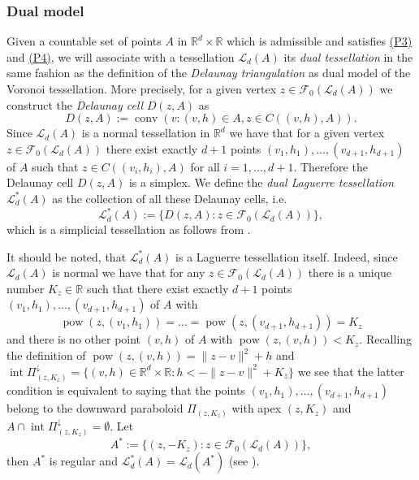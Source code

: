 \documentclass[11pt,a4paper]{article}
\theoremstyle{plain}
\theoremstyle{definition}
\theoremstyle{remark}
\def\RR{\mathbb{R}}
\def\cF{\mathcal{F}}
\def\cL{\mathcal{L}}
\newcommand{\conv}{\mathop{\mathrm{conv}}\nolimits}
\newcommand{\pow}{\mathop{\mathrm{pow}}\nolimits}
\newcommand{\inter}{\operatorname{int}}
\begin{document}
\subsubsection{Dual model}\label{sec:DualModel}

Given a countable set of points $A$ in $\RR^d \times \RR$ which is admissible and satisfies \hyperref[item:P3]{(P3)} and \hyperref[item:P4]{(P4)}, we will associate with a tessellation $\cL_d(A)$ its \textit{dual tessellation} in the same fashion as the definition of the \textit{Delaunay triangulation} as dual model of the Voronoi tessellation. More precisely, for a given vertex $z\in\cF_0(\cL_d(A))$ we construct the \textit{Delaunay cell} $D(z,A)$ as 
\[
    D(z,A) := \conv(v:(v,h)\in A,z\in C((v,h),A)).
\]
Since $\cL_d(A)$ is a normal tessellation in $\RR^d$ we have that for a given vertex $z\in \cF_0(\cL_d(A))$ there exist exactly $d+1$ points $(v_1,h_1),\dots,(v_{d+1},h_{d+1})$ of $A$ such that $z\in C((v_i,h_i),A)$ for all $i=1,\dots,d+1$. Therefore the Delaunay cell $D(z,A)$ is a simplex. We define the \textit{dual Laguerre tessellation} $\cL_d^*(A)$ as the collection of all these Delaunay cells, i.e.
\[
    \cL_d^*(A):=\{D(z,A):z\in \cF_0(\cL_d(A))\},
\]  
which is a simplicial tessellation as follows from \cite[Proposition 2]{Sch93}. 

It should be noted, that $\cL_d^*(A)$ is a Laguerre tessellation itself. Indeed, since $\cL_d(A)$ is normal we have that for any $z\in\cF_0(\cL_d(A))$ there is a unique number $K_z\in \RR$ such that there exist exactly $d+1$ points $(v_1,h_1),\dots,(v_{d+1},h_{d+1})$ of $A$ with
\[
    \pow(z,(v_1,h_1))=\ldots=\pow(z,(v_{d+1},h_{d+1}))=K_z
\]
and there is no other point $(v,h)$ of $A$ with $\pow(z,(v,h)) < K_z$. Recalling the definition of $\pow(z,(v,h))=\|z-v\|^2+h$ and $\inter \Pi_{(z,K_z)}^{\downarrow}=\{(v,h)\in \RR^d \times \RR: h < - \|z-v\|^2 + K_z \}$ we see that the latter condition is equivalent to saying that the points $(v_1,h_1),\dots,(v_{d+1},h_{d+1})$ belong to the downward paraboloid $\Pi_{(z,K_z)}$ with apex $(z,K_z)$ and $A\cap \inter \Pi_{(z,K_z)}^{\downarrow}=\emptyset$. Let
\begin{equation}\label{eq:Astar}
    A^*:=\{(z,-K_z)\colon z\in \cF_0(\cL_d(A))\},
\end{equation}
then $A^*$ is regular and $\cL_d^*(A)=\cL_d(A^*)$ (see \cite[Proposition 2]{Sch93}).
\end{document}
